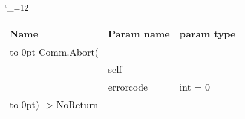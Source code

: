 \begingroup \catcode`\_=12 \tt
\begin{tabular}{lll}
\toprule
\textrm{Name}&\textrm{Param name}&\textrm{param type}\\
\midrule
\hbox to 0pt {Comm.Abort(\hss}\\
& self\\
& errorcode & int = 0\\
\hbox to 0pt{) -> NoReturn\hss}\\
\bottomrule
\end{tabular}
\endgroup
